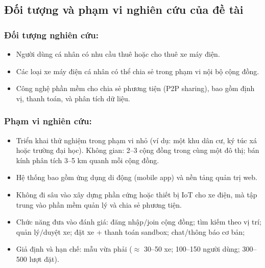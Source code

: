 \subsection{Đối tượng và phạm vi nghiên cứu của đề tài}
\subsubsection*{Đối tượng nghiên cứu:}
\begin{itemize}
    \item Người dùng cá nhân có nhu cầu thuê hoặc cho thuê xe máy điện.
    \item Các loại xe máy điện cá nhân có thể chia sẻ trong phạm vi nội bộ cộng đồng.
    \item Công nghệ phần mềm cho chia sẻ phương tiện (P2P sharing), bao gồm định vị, thanh toán, và phân tích dữ liệu.
\end{itemize}

\subsubsection*{Phạm vi nghiên cứu:}
\begin{itemize}
    \item Triển khai thử nghiệm trong phạm vi nhỏ (ví dụ: một khu dân cư, ký túc xá hoặc trường đại học). Không gian: 2–3 cộng đồng trong cùng một đô thị; bán kính phân tích 3–5 km quanh mỗi cộng đồng.
    \item Hệ thống bao gồm ứng dụng di động (mobile app) và nền tảng quản trị web.
    \item Không đi sâu vào xây dựng phần cứng hoặc thiết bị IoT cho xe điện, mà tập trung vào phần mềm quản lý và chia sẻ phương tiện.  
    \item Chức năng đưa vào đánh giá: đăng nhập$/$join cộng đồng; tìm kiếm theo vị trí; quản lý$/$duyệt xe; đặt xe + thanh toán sandbox; chat/thông báo cơ bản; 
    \item  Giả định và hạn chế: mẫu vừa phải ($\approx$ 30–50 xe; 100–150 người dùng; 300–500 lượt đặt).
\end{itemize}

